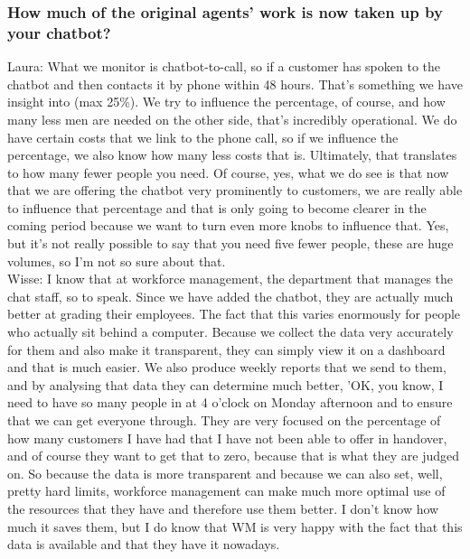 \begin{appendices}
	\subsubsection{How much of the original agents' work is now taken up by your chatbot?}
	Laura: What we monitor is chatbot-to-call, so if a customer has spoken to the chatbot and then contacts it by phone within 48 hours. That's something we have insight into (max 25\%). We try to influence the percentage, of course, and how many less men are needed on the other side, that's incredibly operational. We do have certain costs that we link to the phone call, so if we influence the percentage, we also know how many less costs that is. Ultimately, that translates to how many fewer people you need. Of course, yes, what we do see is that now that we are offering the chatbot very prominently to customers, we are really able to influence that percentage and that is only going to become clearer in the coming period because we want to turn even more knobs to influence that. Yes, but it's not really possible to say that you need five fewer people, these are huge volumes, so I'm not so sure about that.\\
	\break
	Wisse: I know that at workforce management, the department that manages the chat staff, so to speak. Since we have added the chatbot, they are actually much better at grading their employees. The fact that this varies enormously for people who actually sit behind a computer. Because we collect the data very accurately for them and also make it transparent, they can simply view it on a dashboard and that is much easier. We also produce weekly reports that we send to them, and by analysing that data they can determine much better, 'OK, you know, I need to have so many people in at 4 o'clock on Monday afternoon and to ensure that we can get everyone through. They are very focused on the percentage of how many customers I have had that I have not been able to offer in handover, and of course they want to get that to zero, because that is what they are judged on. So because the data is more transparent and because we can also set, well, pretty hard limits, workforce management can make much more optimal use of the resources that they have and therefore use them better. I don't know how much it saves them, but I do know that WM is very happy with the fact that this data is available and that they have it nowadays.
	

\end{appendices}
